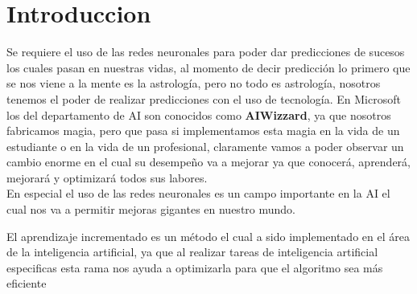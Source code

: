 \section{Introduccion}
Se requiere el uso de las redes neuronales para poder dar predicciones de sucesos los cuales pasan en nuestras vidas, al momento de decir predicción lo primero que se 
nos viene a la mente es la astrología, pero no todo es astrología, nosotros tenemos el poder de realizar predicciones con el uso de tecnología. En Microsoft los del 
departamento de AI son conocidos como \textbf{AIWizzard}, ya que nosotros fabricamos magia, pero que pasa si implementamos esta magia en la vida de un estudiante o en la vida de 
un profesional,  claramente vamos a poder observar un cambio enorme en el cual su desempeño va a mejorar ya que conocerá, aprenderá, mejorará y optimizará todos sus labores. \\
En especial el uso de las redes neuronales es un campo importante en la AI el cual nos va a permitir mejoras gigantes en nuestro mundo.

El aprendizaje incrementado es un método el cual a sido implementado en el área de la inteligencia artificial, ya que al realizar tareas de inteligencia artificial especificas esta rama nos 
ayuda a optimizarla para que el algoritmo sea más eficiente